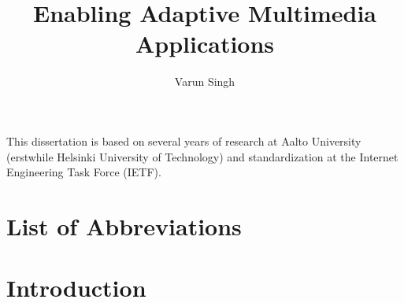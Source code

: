 \documentclass[dissertation,draft*]{aaltoseries} %
\author{Varun Singh}
\title{Enabling Adaptive Multimedia Applications}
\begin{document}


\begin{preface}[Espoo]

This dissertation is based on several years of research at Aalto University
(erstwhile Helsinki University of Technology) and standardization at the 
Internet Engineering Task Force (IETF).

\end{preface}


\tableofcontents

\publicationpunctuation[]{,}{}{,}{,}{,}{}
\publicationformatting[]{}{}{\em}{}{}{}

\listofpublications


 \listoffigures
 \listoftables


%
%


\chapter*{List of Abbreviations}


\chapter{Introduction}
\label{chap1}

\end{document}
